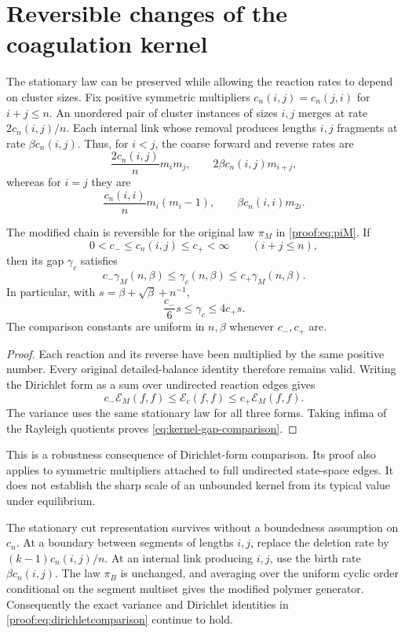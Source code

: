\section{Reversible changes of the coagulation kernel}
\label{sec:kernel-comparison}

The stationary law can be preserved while allowing the reaction rates
to depend on cluster sizes.  Fix positive symmetric multipliers
$c_n(i,j)=c_n(j,i)$ for $i+j\le n$.
An unordered pair of cluster instances of sizes $i,j$ merges at
rate $2c_n(i,j)/n$.  Each internal link whose removal produces lengths
$i,j$ fragments at rate $\beta c_n(i,j)$.
Thus, for $i<j$, the coarse forward and reverse rates are
\[
 \frac{2c_n(i,j)}n m_im_j,
 \qquad 2\beta c_n(i,j)m_{i+j},
\]
whereas for $i=j$ they are
\[
 \frac{c_n(i,i)}n m_i(m_i-1),
 \qquad \beta c_n(i,i)m_{2i}.
\]

\begin{theorem}\label{thm:kernel-comparison}
The modified chain is reversible for the original law $\pi_M$ in
\eqref{proof:eq:piM}.  If
\[
 0<c_-\le c_n(i,j)\le c_+<\infty
 \qquad(i+j\le n),
\]
then its gap $\gamma_c$ satisfies
\begin{equation}\label{eq:kernel-gap-comparison}
 c_-\gamma_M(n,\beta)\le\gamma_c(n,\beta)
      \le c_+\gamma_M(n,\beta).
\end{equation}
In particular, with $s=\beta+\sqrt\beta+n^{-1}$,
\[
 \frac{c_-}{6}s\le\gamma_c\le4c_+s.
\]
The comparison constants are uniform in $n,\beta$ whenever
$c_-,c_+$ are.
\end{theorem}

\begin{proof}
Each reaction and its reverse have been multiplied by the same
positive number.  Every original detailed-balance identity therefore
remains valid.  Writing the Dirichlet form as a sum over undirected
reaction edges gives
\[
 c_-\mathcal E_M(f,f)\le\mathcal E_c(f,f)
       \le c_+\mathcal E_M(f,f).
\]
The variance uses the same stationary law for all three forms.
Taking infima of the Rayleigh quotients proves
\eqref{eq:kernel-gap-comparison}.
\end{proof}

This is a robustness consequence of Dirichlet-form comparison.
Its proof also applies to symmetric multipliers attached to full
undirected state-space edges.
It does not establish the sharp scale of an unbounded kernel from
its typical value under equilibrium.

The stationary cut representation survives without a boundedness
assumption on $c_n$.  At a boundary between segments of lengths $i,j$,
replace the deletion rate by $(k-1)c_n(i,j)/n$.
At an internal link producing $i,j$, use the birth rate
$\beta c_n(i,j)$.  The law $\pi_B$ is unchanged, and averaging over
the uniform cyclic order conditional on the segment multiset gives
the modified polymer generator.  Consequently the exact variance
and Dirichlet identities in \eqref{proof:eq:dirichletcomparison}
continue to hold.

